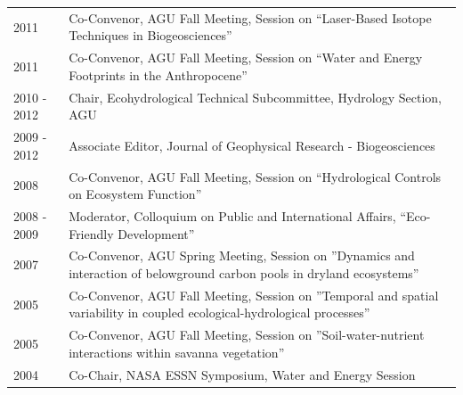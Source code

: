 \begin{longtable}{l p{5.5in}}
2011 & Co-Convenor, AGU Fall Meeting, Session on ``Laser-Based Isotope Techniques in Biogeosciences'' \\
2011 & Co-Convenor, AGU Fall Meeting, Session on ``Water and Energy Footprints in the Anthropocene'' \\
2010 - 2012 & Chair, Ecohydrological Technical Subcommittee, Hydrology Section, AGU \\
2009 - 2012 & Associate Editor, Journal of Geophysical Research - Biogeosciences \\
2008 & Co-Convenor, AGU Fall Meeting, Session on ``Hydrological Controls on Ecosystem Function'' \\
2008 - 2009 & Moderator, Colloquium on Public and International Affairs, ``Eco-Friendly Development'' \\
2007 & Co-Convenor, AGU Spring Meeting, Session on ''Dynamics and interaction of belowground carbon pools in dryland ecosystems'' \\
2005 & Co-Convenor, AGU Fall Meeting, Session on ''Temporal and spatial variability in coupled ecological-hydrological processes'' \\
2005 & Co-Convenor, AGU Fall Meeting, Session on ''Soil-water-nutrient interactions within savanna vegetation'' \\
2004 & Co-Chair, NASA ESSN Symposium, Water and Energy Session \\

\end{longtable}
